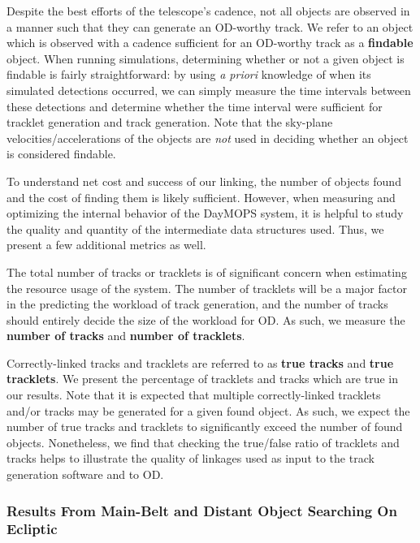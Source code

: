 \documentclass[12pt,preprint]{aastex}
\begin{document}
Despite the best efforts of the telescope's cadence, not all objects
are observed in a manner such that they can generate an OD-worthy
track.  We refer to an object which is observed with a cadence
sufficient for an OD-worthy track as a \textbf{findable} object.  When
running simulations, determining whether or not a given object is
findable is fairly straightforward: by using \textit{a priori}
knowledge of when its simulated detections occurred, we can simply
measure the time intervals between these detections and determine
whether the time interval were sufficient for tracklet generation and
track generation.  Note that the sky-plane velocities/accelerations of
the objects are \textit{not} used in deciding whether an object is
considered findable.


To understand net cost and success of our linking, the number of
objects found and the cost of finding them is likely sufficient.
However, when measuring and optimizing the internal behavior of the
DayMOPS system, it is helpful to study the quality and quantity of the
intermediate data structures used. Thus, we present a few additional
metrics as well.

The total number of tracks or tracklets is of significant concern when
estimating the resource usage of the system.  The number of tracklets
will be a major factor in the predicting the workload of track
generation, and the number of tracks should entirely decide the size
of the workload for OD.  As such, we measure the \textbf{number of
  tracks} and \textbf{number of tracklets}.  

Correctly-linked tracks and tracklets are referred to as \textbf{true
  tracks} and \textbf{true tracklets}. We present the percentage of
tracklets and tracks which are true in our results. Note that it is
expected that multiple correctly-linked tracklets and/or tracks may be
generated for a given found object. As such, we expect the number of
true tracks and tracklets to significantly exceed the number of found
objects.  Nonetheless, we find that checking the true/false ratio of
tracklets and tracks helps to illustrate the quality of linkages used
as input to the track generation software and to OD.





\subsubsection{Results From Main-Belt and Distant Object Searching On Ecliptic}
\end{document}
